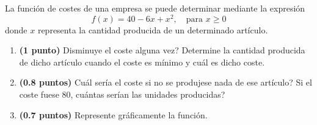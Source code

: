 
La función de costes de una empresa se puede determinar mediante la expresión
\[
f(x)=40-6x+x^2,\quad\text{para }x\geq0
\]
donde $x$ representa la cantidad producida de un determinado artículo.
\begin{enumerate}[label=\alph*)]
\item \textbf{(1 punto)} \textquestiondown{}Disminuye el coste alguna vez? Determine la cantidad producida de dicho artículo cuando el coste es mínimo y cuál es dicho coste.
\item \textbf{(0.8 puntos)} \textquestiondown{}Cuál sería el coste si no se produjese nada de ese artículo? Si el coste fuese 80, \textquestiondown{}cuántas serían las unidades producidas?
\item \textbf{(0.7 puntos)} Represente gráficamente la función.
\end{enumerate}
